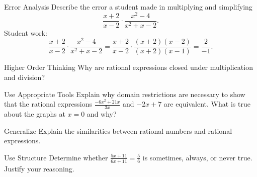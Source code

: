 \documentclass{article}
\newenvironment{practice}[2]{}{}        %
\newcommand{\answer}[1]{}               %
\begin{document}
\begin{practice}{12}{2}
Error Analysis Describe the error a student made in multiplying and simplifying
\[
\frac{x+2}{x-2}\cdot\frac{x^2-4}{x^2+x-2}.
\]
Student work:
\[
\frac{x+2}{x-2}\cdot\frac{x^2-4}{x^2+x-2}
=
\frac{x+2}{x-2}\cdot\frac{(x+2)(x-2)}{(x+2)(x-1)}
=
\frac{2}{-1}.
\]

\answer{The student cannot cancel the $x$'s in $x+2$ and $x-1$ because only common factors, not terms, can be canceled.}
\end{practice}

\begin{practice}{13}{3}
Higher Order Thinking Why are rational expressions closed under multiplication and division?

\answer{Sample: $\frac{a}{b}\div\frac{c}{d}=\frac{\frac{a}{b}}{\frac{c}{d}}=\frac{\frac{a}{b}}{\frac{c}{d}}\times\frac{\frac{d}{c}}{\frac{d}{c}}=\frac{ad}{bc}\div\frac{cd}{dc}=\frac{ad}{bc}\div1=\frac{ad}{bc}=\frac{a}{b}\times\frac{d}{c}$.}
\end{practice}

\begin{practice}{14}{2}
Use Appropriate Tools Explain why domain restrictions are necessary to show that the rational expressions $\frac{-6x^2+21x}{3x}$ and $-2x+7$ are equivalent. What is true about the graphs at $x=0$ and why?

\answer{Sample answer: Domain restrictions are needed because you may not be able to tell just from graphs when two expressions are not equivalent. The graphs of $y=\frac{-6x^2+21x}{3x}$ and $y=-2x+7$ may look identical, but using the trace feature or a table values, $y=\frac{-6x^2+21x}{3x}$ is undefined at $x=0$, while $y=-2x+7$ is equal to 7 at $x=0$.}
\end{practice}

\begin{practice}{15}{2}
Generalize Explain the similarities between rational numbers and rational expressions.

\answer{A rational number is the ratio of two integers, while a rational expression is a ratio of two polynomials.}
\end{practice}

\begin{practice}{16}{2}
Use Structure Determine whether $\frac{5x+11}{6x+11}=\frac56$ is sometimes, always, or never true. Justify your reasoning.

\answer{Never; when you cross multiply, you get $30x+66=30x+55$; since $66\neq55$, there is no real number $x$ for which that equation is true.}
\end{practice}
\end{document}
